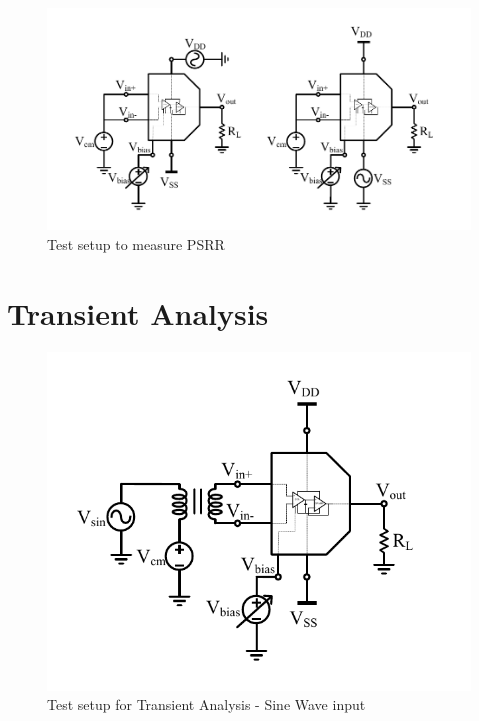 \begin{figure} [H]
\centering
\includegraphics[scale=1]{Figures/Test_Benches/Overall/PSRR.pdf}
\caption{Test setup to measure PSRR}
\end{figure}

\section{Transient Analysis}
\begin{figure} [H]
\centering
\includegraphics[scale=1]{Figures/Test_Benches/Overall/SINE.pdf}
\caption{Test setup for Transient Analysis - Sine Wave input}
\end{figure}

